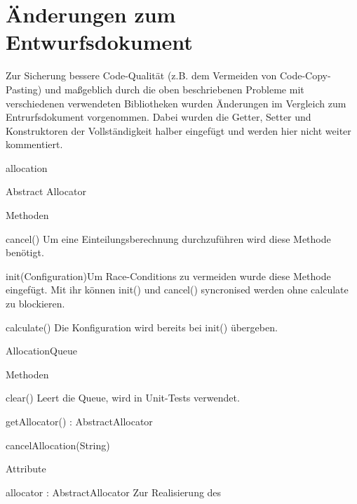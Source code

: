 \documentclass[parskip=full]{scrartcl}
\newcommand{\changeDescription}[1]{{\newline\color{black}\normalfont #1}}
\newcommand{\code}[1]{{\ttfamily #1}}
\begin{document}
\section{Änderungen zum Entwurfsdokument}
Zur Sicherung bessere Code-Qualität (z.B. dem Vermeiden von Code-Copy-Pasting)
und maßgeblich durch die oben beschriebenen Probleme mit verschiedenen
verwendeten Bibliotheken  wurden Änderungen im Vergleich zum  Entrurfsdokument
vorgenommen. 
Dabei wurden die Getter, Setter und Konstruktoren der Vollständigkeit halber
eingefügt und werden hier nicht weiter kommentiert.
\begin{itemPackage}
\item allocation
\begin{itemClass}
\item Abstract Allocator
\begin{itemClassSub}
\item Methoden
\begin{itemPlus}
\item cancel() \changeDescription{Um eine Einteilungsberechnung durchzuführen
wird diese Methode benötigt.}
\item init(Configuration)\changeDescription{Um Race-Conditions zu vermeiden
wurde diese Methode eingefügt. Mit ihr können \code{init()} und \code{cancel()}
syncronised werden ohne calculate zu blockieren.}
\end{itemPlus}
\begin{itemChange}
\item calculate() \changeDescription{Die Konfiguration wird bereits bei
\code{init()} übergeben.}
\end{itemChange}
\end{itemClassSub}
\item AllocationQueue
\begin{itemClassSub}
\item Methoden
\begin{itemPlus}
\item clear() \changeDescription{Leert die Queue, wird in Unit-Tests verwendet.}
\item getAllocator() : AbstractAllocator
\end{itemPlus}
\begin{itemChange}
\item cancelAllocation(String)
\end{itemChange}
\item Attribute
\begin{itemPlus}
\item allocator : AbstractAllocator \changeDescription{Zur Realisierung des
}
\end{itemPlus}
\end{itemClassSub}
\end{itemClass}
\end{itemPackage}
\end{document}
